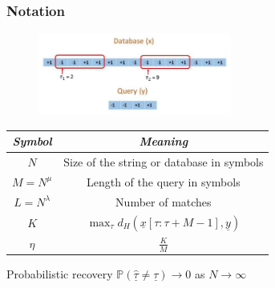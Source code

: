\documentclass[10pt,xcolor=table]{beamer}
\newcommand{\mbb}{\mathbb}
\newcommand{\xv}{\underline{x}}
\newcommand{\yv}{\underline{y}}
\begin{document}
\begin{frame}\frametitle{Notation}

	\begin{figure}[t]
		\centering
		\includegraphics[width=2.5in]{Pattern_matching_ex.pdf}
	\end{figure}
	\vspace{-8pt}
	{\small
	\begin{table}[h!]
		\label{Table:Notations3}
		\begin{center}
			\begin{tabular}{|c|c|} 	
				\hline		
				\textit{Symbol}		&  \textit{Meaning} \\		
				\hline
				$N$           		& Size of the string or database in symbols \\
				\hline
				$M = N^{\mu}$       & Length of the query in symbols \\
				\hline
				$L = N^\lambda$    &   Number of matches \\
				\hline
				$K$             &$\max_{\tau}d_{H}(\xv[\tau:\tau+M-1],\yv)$\\
				\hline
				$\eta$             &$\frac{K}{M}$\\
				\hline
			\end{tabular}
		\end{center}
	\end{table}
    }
    \begin{block}{Probabilistic recovery}
    $\mbb{P}(\hat{\underline{\tau}} \neq \underline{\tau}) \rightarrow 0$ as $N \rightarrow \infty$
    \end{block}
	\end{frame}	
\end{document}
